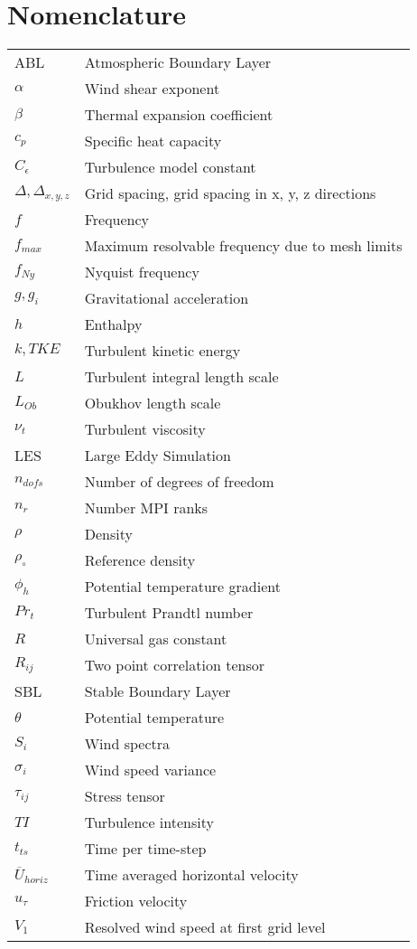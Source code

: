 \documentclass[conf]{new-aiaa}
\begin{document}
\section{Nomenclature}
{\renewcommand\arraystretch{1.0}
  \noindent\begin{longtable*}{@{}l @{\quad=\quad} l@{}}
ABL       & Atmospheric Boundary Layer \\
$\alpha$  & Wind shear exponent  \\
$\beta$   & Thermal expansion coefficient \\
$c_p$     & Specific heat capacity \\
$C_\epsilon$  & Turbulence model constant \\
$\Delta, \Delta_{x,y,z}$  & Grid spacing, grid spacing in x, y, z directions \\
$f$       & Frequency \\
$f_{max}$  & Maximum resolvable frequency due to mesh limits \\
$f_{Ny}$   & Nyquist frequency \\
$g, g_i$   & Gravitational acceleration \\
$h$       & Enthalpy \\
$k, TKE$  & Turbulent kinetic energy \\
$L$       & Turbulent integral length scale \\
$L_{Ob}$   & Obukhov length scale \\
$\nu_t$   & Turbulent viscosity \\
LES       & Large Eddy Simulation \\
$n_{dofs}$ & Number of degrees of freedom \\
$n_r$     & Number MPI ranks \\
$\rho$    & Density \\
$\rho_\circ$ & Reference density  \\
$\phi_h$  & Potential temperature gradient \\
$Pr_t$    & Turbulent Prandtl number \\
$R$       & Universal gas constant \\
$R_{ij}$   & Two point correlation tensor \\
SBL       & Stable Boundary Layer \\
$\theta$  & Potential temperature \\
$S_i$     & Wind spectra \\
$\sigma_i$ & Wind speed variance \\
$\tau_{ij}$ & Stress tensor \\
$TI$      & Turbulence intensity \\
$t_{ts}$  & Time per time-step \\
$\overline{U}_{horiz}$ & Time averaged horizontal velocity \\
$u_\tau$   & Friction velocity    \\
$V_1$     & Resolved wind speed at first grid level 
\end{longtable*}}
\end{document}
